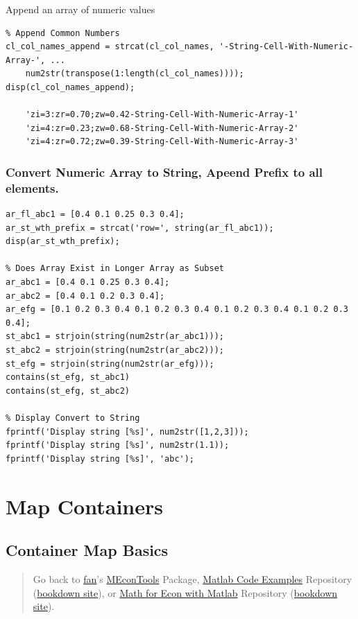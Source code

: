 \documentclass[
]{book}
\begin{document}
Append an array of numeric values

\begin{verbatim}
% Append Common Numbers
cl_col_names_append = strcat(cl_col_names, '-String-Cell-With-Numeric-Array-', ...
    num2str(transpose(1:length(cl_col_names))));
disp(cl_col_names_append);

    'zi=3:zr=0.70;zw=0.42-String-Cell-With-Numeric-Array-1'
    'zi=4:zr=0.23;zw=0.68-String-Cell-With-Numeric-Array-2'
    'zi=4:zr=0.72;zw=0.39-String-Cell-With-Numeric-Array-3'
\end{verbatim}

\hypertarget{convert-numeric-array-to-string-apeend-prefix-to-all-elements.}{%
\subsubsection{Convert Numeric Array to String, Apeend Prefix to all elements.}\label{convert-numeric-array-to-string-apeend-prefix-to-all-elements.}}

\begin{verbatim}
ar_fl_abc1 = [0.4 0.1 0.25 0.3 0.4];
ar_st_wth_prefix = strcat('row=', string(ar_fl_abc1));
disp(ar_st_wth_prefix);

% Does Array Exist in Longer Array as Subset
ar_abc1 = [0.4 0.1 0.25 0.3 0.4];
ar_abc2 = [0.4 0.1 0.2 0.3 0.4];
ar_efg = [0.1 0.2 0.3 0.4 0.1 0.2 0.3 0.4 0.1 0.2 0.3 0.4 0.1 0.2 0.3 0.4];
st_abc1 = strjoin(string(num2str(ar_abc1)));
st_abc2 = strjoin(string(num2str(ar_abc2)));
st_efg = strjoin(string(num2str(ar_efg)));
contains(st_efg, st_abc1)
contains(st_efg, st_abc2)

% Display Convert to String
fprintf('Display string [%s]', num2str([1,2,3]));
fprintf('Display string [%s]', num2str(1.1));
fprintf('Display string [%s]', 'abc');
\end{verbatim}

\hypertarget{map-containers}{%
\section{Map Containers}\label{map-containers}}

\hypertarget{container-map-basics}{%
\subsection{Container Map Basics}\label{container-map-basics}}

\begin{quote}
Go back to \href{http://fanwangecon.github.io/}{fan}'s \href{https://fanwangecon.github.io/MEconTools/}{MEconTools} Package, \href{https://fanwangecon.github.io/M4Econ/}{Matlab Code Examples} Repository (\href{https://fanwangecon.github.io/M4Econ/bookdown}{bookdown site}), or \href{https://fanwangecon.github.io/Math4Econ/}{Math for Econ with Matlab} Repository (\href{https://fanwangecon.github.io/Math4Econ/bookdown}{bookdown site}).
\end{quote}
\end{document}
